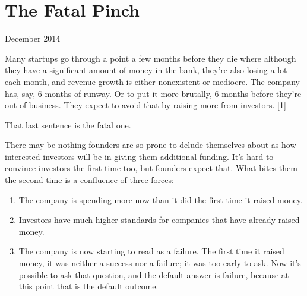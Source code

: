 \chapter{The Fatal Pinch}


            
              
                

December 2014

Many startups go through a point a
                  few months before they die where although they have a
                  significant amount of money in the bank, they're also losing a
                  lot each month, and revenue growth is either nonexistent or
                  mediocre. The company has, say, 6 months of runway. Or to put
                  it more brutally, 6 months before they're out of business.
                  They expect to avoid that by raising more from investors.
                  [\href{\#f1n}{1}]

That last sentence is the fatal one.

There
                  may be nothing founders are so prone to delude themselves
                  about as how interested investors will be in giving them
                  additional funding. It's hard to convince investors the first
                  time too, but founders expect that. What bites them the second
                  time is a confluence of three forces:
                  \begin{enumerate}
\item 
                      The company is spending more now than it did the first
                      time it raised money.


                    
\item 
                      Investors have much higher standards for companies that
                      have already raised money.


                    
\item 
                      The company is now starting to read as a failure. The
                      first time it raised money, it was neither a success nor a
                      failure; it was too early to ask. Now it's possible to ask
                      that question, and the default answer is failure, because
                      at this point that is the default outcome.
                    
\end{enumerate}


